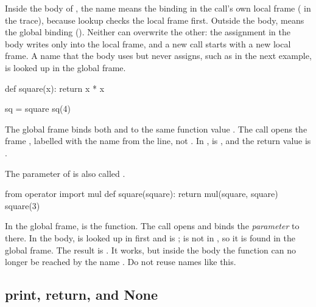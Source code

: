 \documentclass[10pt]{scrartcl}
\begin{document}
\revisit Inside the body of , the name  means the binding in the call's own local frame ( in the trace), because lookup checks the local frame first. Outside the body,  means the global binding (). Neither can overwrite the other: the assignment  in the body writes only into the local frame, and a new call starts with a new local frame. A name that the body uses but never assigns, such as  in the next example, is looked up in the global frame.

\begin{example*}
\begin{py}
def square(x):
    return x * x

sq = square
sq(4)
\end{py}
The global frame binds both  and  to the same function value . The call  opens the frame , labelled with the name from the  line, not . In ,  is , and the return value is .
\end{example*}

\begin{example*}
The parameter of  is also called .
\begin{py}
from operator import mul
def square(square):
    return mul(square, square)
square(3)
\end{py}
\begin{itemize}
  \ii In the global frame,  is the function. The call  opens  and binds the \emph{parameter}  to  there.
  \ii In the body,  is looked up in  first and is ;  is not in , so it is found in the global frame. The result is .
  \ii It works, but inside the body the function can no longer be reached by the name . Do not reuse names like this.
\end{itemize}
\end{example*}

\subsection{print, return, and None}
\end{document}
